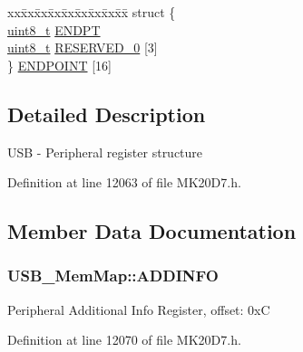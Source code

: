 \begin{DoxyCompactItemize}
\begin{tabbing}
\end{tabbing}\item 
\begin{tabbing}
xx\=xx\=xx\=xx\=xx\=xx\=xx\=xx\=xx\=\kill
struct \{\\
\>\hyperlink{_p_e___types_8h_aba7bc1797add20fe3efdf37ced1182c5}{uint8\_t} \hyperlink{struct_u_s_b___mem_map_a86aaba02227a45a333f72565b0bec378}{ENDPT}\\
\>\hyperlink{_p_e___types_8h_aba7bc1797add20fe3efdf37ced1182c5}{uint8\_t} \hyperlink{struct_u_s_b___mem_map_ae515c02ab9f75ff7003ca2bba944c139}{RESERVED\_0} \mbox{[}3\mbox{]}\\
\} \hyperlink{struct_u_s_b___mem_map_a13975b0cab8f0b16d8f906892722dfa7}{ENDPOINT} \mbox{[}16\mbox{]}\\

\end{tabbing}\end{DoxyCompactItemize}


\subsection{Detailed Description}
U\+SB -\/ Peripheral register structure 

Definition at line 12063 of file M\+K20\+D7.\+h.



\subsection{Member Data Documentation}
\subsubsection[{\texorpdfstring{A\+D\+D\+I\+N\+FO}{ADDINFO}}]{ U\+S\+B\+\_\+\+Mem\+Map\+::\+A\+D\+D\+I\+N\+FO}\hypertarget{struct_u_s_b___mem_map_aa87a73875ff45abb9b84992687f48000}{}\label{struct_u_s_b___mem_map_aa87a73875ff45abb9b84992687f48000}
Peripheral Additional Info Register, offset\+: 0xC 

Definition at line 12070 of file M\+K20\+D7.\+h.

